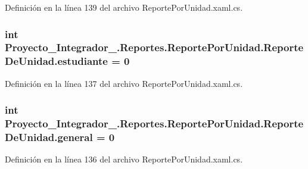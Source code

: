 Definición en la línea 139 del archivo Reporte\-Por\-Unidad.\-xaml.\-cs.

\hypertarget{class_proyecto___integrador__3_1_1_reportes_1_1_reporte_por_unidad_1_1_reporte_de_unidad_a1f6de144584bd3705d824d4f06dd6cf0}{
\subsubsection[{estudiante}]{\setlength{\rightskip}{0pt plus 5cm}int Proyecto\-\_\-\-Integrador\-\_.\-Reportes.\-Reporte\-Por\-Unidad.\-Reporte\-De\-Unidad.\-estudiante = 0\hspace{0.3cm}{\ttfamily [private]}}}\label{class_proyecto___integrador__3_1_1_reportes_1_1_reporte_por_unidad_1_1_reporte_de_unidad_a1f6de144584bd3705d824d4f06dd6cf0}


Definición en la línea 137 del archivo Reporte\-Por\-Unidad.\-xaml.\-cs.

\hypertarget{class_proyecto___integrador__3_1_1_reportes_1_1_reporte_por_unidad_1_1_reporte_de_unidad_a9e0e8780e5b3f5f6d09c96c104732388}{
\subsubsection[{general}]{\setlength{\rightskip}{0pt plus 5cm}int Proyecto\-\_\-\-Integrador\-\_.\-Reportes.\-Reporte\-Por\-Unidad.\-Reporte\-De\-Unidad.\-general = 0\hspace{0.3cm}{\ttfamily [private]}}}\label{class_proyecto___integrador__3_1_1_reportes_1_1_reporte_por_unidad_1_1_reporte_de_unidad_a9e0e8780e5b3f5f6d09c96c104732388}


Definición en la línea 136 del archivo Reporte\-Por\-Unidad.\-xaml.\-cs.


